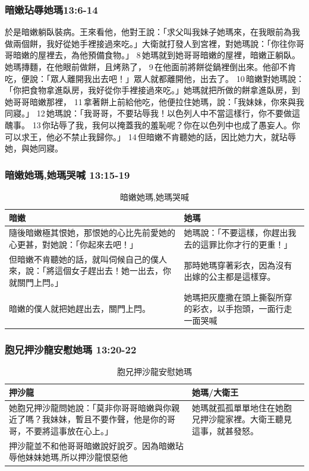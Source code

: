 \subsubsection{暗嫩玷辱她瑪13:6-14}
於是暗嫩躺臥裝病。王來看他，他對王說：「求父叫我妹子她瑪來，在我眼前為我做兩個餅，我好從她手裡接過來吃。」大衛就打發人到宮裡，對她瑪說：「你往你哥哥暗嫩的屋裡去，為他預備食物。」 8 她瑪就到她哥哥暗嫩的屋裡，暗嫩正躺臥。她瑪摶麵，在他眼前做餅，且烤熟了， 9 在他面前將餅從鍋裡倒出來。他卻不肯吃，便說：「眾人離開我出去吧！」眾人就都離開他，出去了。 10 暗嫩對她瑪說：「你把食物拿進臥房，我好從你手裡接過來吃。」她瑪就把所做的餅拿進臥房，到她哥哥暗嫩那裡， 11 拿著餅上前給他吃，他便拉住她瑪，說：「我妹妹，你來與我同寢。」 12 她瑪說：「我哥哥，不要玷辱我！以色列人中不當這樣行，你不要做這醜事。 13 你玷辱了我，我何以掩蓋我的羞恥呢？你在以色列中也成了愚妄人。你可以求王，他必不禁止我歸你。」 14 但暗嫩不肯聽她的話，因比她力大，就玷辱她，與她同寢。

\subsubsection{暗嫩她瑪,她瑪哭喊 13:15-19}
\begin{table}[H]
\hspace*{-13mm}
\centering 
\begin{tabular}{p{}|p{10.75cm}}\hline\hline
暗嫩&她瑪\\\hline
隨後暗嫩極其恨她，那恨她的心比先前愛她的心更甚，對她說：「你起來去吧！」&她瑪說：「不要這樣，你趕出我去的這罪比你才行的更重！」\\\hline
但暗嫩不肯聽她的話，就叫伺候自己的僕人來，說：「將這個女子趕出去！她一出去，你就關門上閂。」 &那時她瑪穿著彩衣，因為沒有出嫁的公主都是這樣穿。\\\hline
暗嫩的僕人就把她趕出去，關門上閂。&她瑪把灰塵撒在頭上撕裂所穿的彩衣，以手抱頭，一面行走一面哭喊\\\hline
\end{tabular}
\caption{暗嫩她瑪,她瑪哭喊}
\end{table}

\subsubsection{胞兄押沙龍安慰她瑪 13:20-22}
\begin{table}[H]
\hspace*{-13mm}
\centering 
\begin{tabular}{p{12.5cm}|p{5.75cm}}\hline\hline
押沙龍&她瑪/大衛王\\\hline
她胞兄押沙龍問她說：「莫非你哥哥暗嫩與你親近了嗎？我妹妹，暫且不要作聲，他是你的哥哥，不要將這事放在心上。」&她瑪就孤孤單單地住在她胞兄押沙龍家裡。大衛王聽見這事，就甚發怒。\\\hline
押沙龍並不和他哥哥暗嫩說好說歹。因為暗嫩玷辱他妹妹她瑪,所以押沙龍恨惡他&\\\hline
\end{tabular}
\caption{胞兄押沙龍安慰她瑪}
\end{table}


